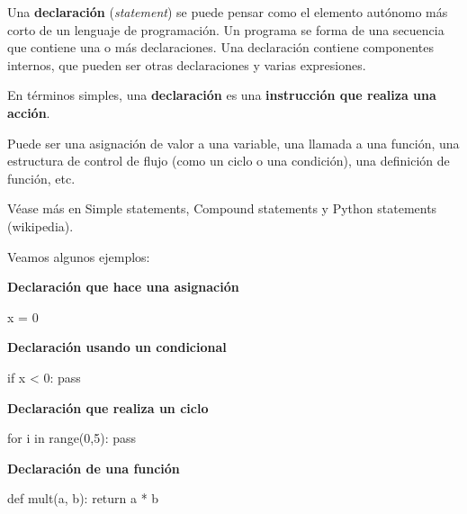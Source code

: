 \documentclass[
  letterpaper,
  DIV=11,
  numbers=noendperiod]{scrreprt}
\newenvironment{Shaded}{\begin{snugshade}}{\end{snugshade}}
\newcommand{\BuiltInTok}[1]{\textcolor[rgb]{0.00,0.23,0.31}{#1}}
\newcommand{\ControlFlowTok}[1]{\textcolor[rgb]{0.00,0.23,0.31}{#1}}
\newcommand{\DecValTok}[1]{\textcolor[rgb]{0.68,0.00,0.00}{#1}}
\newcommand{\KeywordTok}[1]{\textcolor[rgb]{0.00,0.23,0.31}{#1}}
\newcommand{\NormalTok}[1]{\textcolor[rgb]{0.00,0.23,0.31}{#1}}
\newcommand{\OperatorTok}[1]{\textcolor[rgb]{0.37,0.37,0.37}{#1}}
\begin{document}
Una \textbf{declaración} (\emph{statement}) se puede pensar como el
elemento autónomo más corto de un lenguaje de programación. Un programa
se forma de una secuencia que contiene una o más declaraciones. Una
declaración contiene componentes internos, que pueden ser otras
declaraciones y varias expresiones.

En términos simples, una \textbf{declaración} es una \textbf{instrucción
que realiza una acción}.

Puede ser una asignación de valor a una variable, una llamada a una
función, una estructura de control de flujo (como un ciclo o una
condición), una definición de función, etc.

Véase más en Simple statements, Compound statements y Python statements
(wikipedia).

Veamos algunos ejemplos:

\textbf{Declaración que hace una asignación}

\begin{Shaded}
\begin{Highlighting}[]
\NormalTok{x }\OperatorTok{=} \DecValTok{0}
\end{Highlighting}
\end{Shaded}

\textbf{Declaración usando un condicional}

\begin{Shaded}
\begin{Highlighting}[]
\ControlFlowTok{if}\NormalTok{ x }\OperatorTok{\textless{}} \DecValTok{0}\NormalTok{:}
    \ControlFlowTok{pass}
\end{Highlighting}
\end{Shaded}

\textbf{Declaración que realiza un ciclo}

\begin{Shaded}
\begin{Highlighting}[]
\ControlFlowTok{for}\NormalTok{ i }\KeywordTok{in} \BuiltInTok{range}\NormalTok{(}\DecValTok{0}\NormalTok{,}\DecValTok{5}\NormalTok{):}
    \ControlFlowTok{pass}
\end{Highlighting}
\end{Shaded}

\textbf{Declaración de una función}

\begin{Shaded}
\begin{Highlighting}[]
\KeywordTok{def}\NormalTok{ mult(a, b):}
    \ControlFlowTok{return}\NormalTok{ a }\OperatorTok{*}\NormalTok{ b}
\end{Highlighting}
\end{Shaded}
\end{document}
